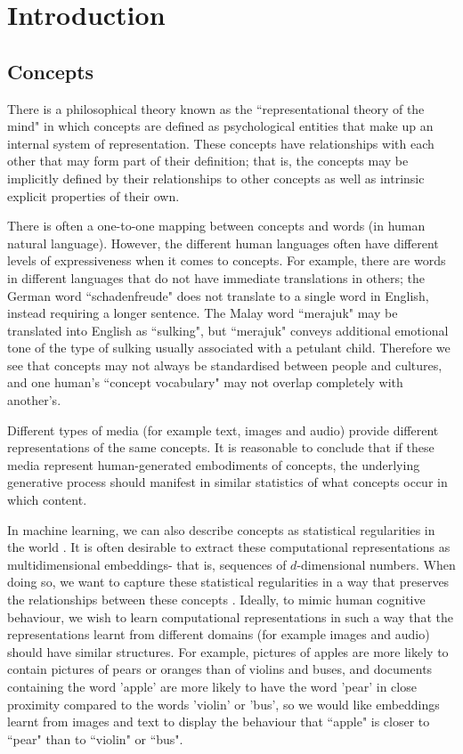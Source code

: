\chapter{Introduction}

\section{Concepts}

There is a philosophical theory known as the ``representational theory of the mind" \cite{stanfordconcepts} in which concepts are defined as psychological entities that make up an internal system of representation. These concepts have relationships with each other that may form part of their definition; that is, the concepts may be implicitly defined by their relationships to other concepts as well as intrinsic explicit properties of their own. 

There is often a one-to-one mapping between concepts and words (in human natural language). However, the different human languages often have different levels of expressiveness when it comes to concepts. For example, there are words in different languages that do not have immediate translations in others; the German word ``schadenfreude" does not translate to a single word in English, instead requiring a longer sentence. The Malay word ``merajuk"  may be translated into English as ``sulking", but ``merajuk" conveys additional emotional tone of the type of sulking usually associated with a petulant child. Therefore we see that concepts may not always be standardised between people and cultures, and one human's ``concept vocabulary" may not overlap completely with another's. 

Different types of media (for example text, images and audio) provide different representations of the same concepts. It is reasonable to conclude that if these media represent human-generated embodiments of concepts, the underlying generative process should manifest in similar statistics of what concepts occur in which content. 

In machine learning, we can  also describe concepts as statistical regularities in the world \cite{RoadsLoveNatureMachineIntelligence}. It is often desirable to extract these computational representations as multidimensional embeddings- that is, sequences of $d$-dimensional numbers. When doing so, we want to capture these statistical regularities in a way that preserves the relationships between these concepts \cite{RoadsLoveNatureMachineIntelligence}. Ideally, to mimic human cognitive behaviour, we wish to learn computational representations in such a way that the representations learnt from different domains (for example images and audio) should have similar structures. For example, pictures of apples are more likely to contain pictures of pears or oranges than of violins and buses, and documents containing the word 'apple' are more likely to have the word 'pear' in close proximity compared to the words 'violin' or 'bus', so we would like embeddings learnt from images and text to display the behaviour that ``apple" is closer to ``pear" than to ``violin" or ``bus". 

